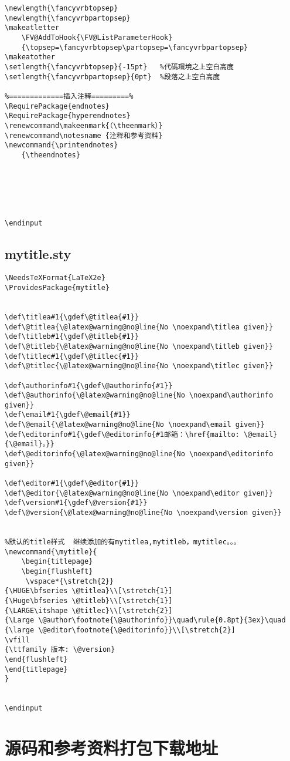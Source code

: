 \begin{verbatim}
\newlength{\fancyvrbtopsep}
\newlength{\fancyvrbpartopsep}
\makeatletter
	\FV@AddToHook{\FV@ListParameterHook}
	{\topsep=\fancyvrbtopsep\partopsep=\fancyvrbpartopsep}
\makeatother
\setlength{\fancyvrbtopsep}{-15pt}   %代碼環境之上空白高度
\setlength{\fancyvrbpartopsep}{0pt}  %段落之上空白高度

%=============插入注释=========%
\RequirePackage{endnotes}
\RequirePackage{hyperendnotes}
\renewcommand\makeenmark{（\theenmark）}
\renewcommand\notesname {注释和参考资料}
\newcommand{\printendnotes}
    {\theendnotes}






\endinput

\end{verbatim}


\section{mytitle.sty}
\begin{verbatim}
\NeedsTeXFormat{LaTeX2e}
\ProvidesPackage{mytitle}


\def\titlea#1{\gdef\@titlea{#1}}
\def\@titlea{\@latex@warning@no@line{No \noexpand\titlea given}}
\def\titleb#1{\gdef\@titleb{#1}}
\def\@titleb{\@latex@warning@no@line{No \noexpand\titleb given}}
\def\titlec#1{\gdef\@titlec{#1}}
\def\@titlec{\@latex@warning@no@line{No \noexpand\titlec given}}

\def\authorinfo#1{\gdef\@authorinfo{#1}}
\def\@authorinfo{\@latex@warning@no@line{No \noexpand\authorinfo given}}
\def\email#1{\gdef\@email{#1}}
\def\@email{\@latex@warning@no@line{No \noexpand\email given}}
\def\editorinfo#1{\gdef\@editorinfo{#1邮箱：\href{mailto: \@email}{\@email}。}}
\def\@editorinfo{\@latex@warning@no@line{No \noexpand\editorinfo given}}

\def\editor#1{\gdef\@editor{#1}}
\def\@editor{\@latex@warning@no@line{No \noexpand\editor given}}
\def\version#1{\gdef\@version{#1}}
\def\@version{\@latex@warning@no@line{No \noexpand\version given}}


%默认的title样式  继续添加的有mytitlea,mytitleb，mytitlec。。。
\newcommand{\mytitle}{
	\begin{titlepage}
	\begin{flushleft}	
	 \vspace*{\stretch{2}}
{\HUGE\bfseries \@titlea}\\[\stretch{1}]
{\Huge\bfseries \@titleb}\\[\stretch{1}]
{\LARGE\itshape \@titlec}\\[\stretch{2}]
{\Large \@author\footnote{\@authorinfo}}\quad\rule{0.8pt}{3ex}\quad
{\large \@editor\footnote{\@editorinfo}}\\[\stretch{2}]
\vfill
{\ttfamily 版本: \@version}
\end{flushleft}
\end{titlepage}
}


\endinput

\end{verbatim}

\chapter{源码和参考资料打包下载地址}